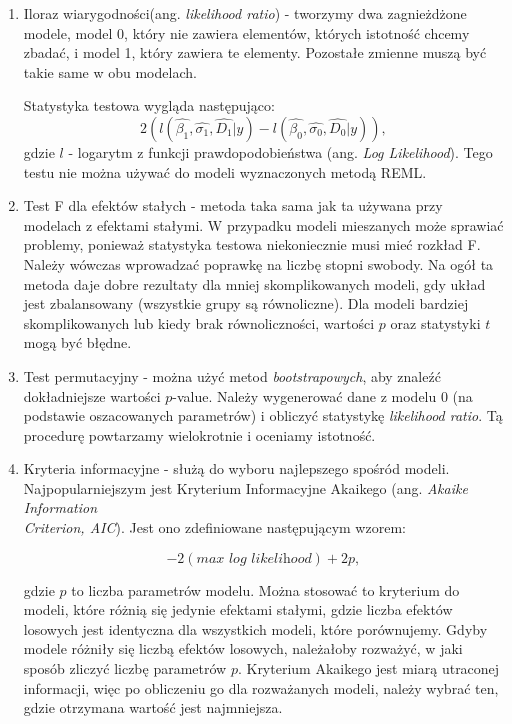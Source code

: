 \documentclass[12pt]{mwbk}
\theoremstyle{plain}
\theoremstyle{definition}
\theoremstyle{remark}
\begin{document}
\begin{enumerate}
	\item Iloraz wiarygodności(ang. \textit{likelihood ratio}) - tworzymy dwa zagnieżdżone modele, model 0, który nie zawiera elementów, których istotność chcemy zbadać, i model 1, który zawiera te elementy. Pozostałe zmienne muszą być takie same w obu modelach.
	
	Statystyka testowa wygląda następująco:
	$$2(l(\hat{\beta_1}, \hat{\sigma_1}, \hat{D_1}|y)-l(\hat{\beta_0}, \hat{\sigma_0}, \hat{D_0}|y)),$$
	gdzie $l$ - logarytm z funkcji prawdopodobieństwa (ang. \textit{Log Likelihood}). Tego testu nie można używać do modeli wyznaczonych metodą REML.
	
	\item Test F dla efektów stałych - metoda taka sama jak ta używana przy modelach z efektami stałymi. W przypadku modeli mieszanych może sprawiać problemy, ponieważ statystyka testowa niekoniecznie musi mieć rozkład F. Należy wówczas wprowadzać poprawkę na liczbę stopni swobody. Na ogół ta metoda daje dobre rezultaty dla mniej skomplikowanych modeli, gdy układ jest zbalansowany (wszystkie grupy są równoliczne). Dla modeli bardziej skomplikowanych lub kiedy brak równoliczności, wartości $p$ oraz statystyki $t$ mogą być błędne.
	
	\item Test permutacyjny - można użyć metod \textit{bootstrapowych}, aby znaleźć dokładniejsze wartości $p$-value. Należy wygenerować dane z modelu 0 (na podstawie oszacowanych parametrów) i obliczyć statystykę \textit{likelihood ratio}. Tą procedurę powtarzamy wielokrotnie i oceniamy istotność.
	

	\item Kryteria informacyjne - służą do wyboru najlepszego spośród modeli. Najpopularniejszym jest Kryterium Informacyjne Akaikego (ang. \textit{Akaike Information \\Criterion, AIC}). Jest ono zdefiniowane następującym wzorem:
	
	$$-2(\textit{max log likelihood})+ 2p,$$
	
	gdzie $p$ to liczba parametrów modelu. Można stosować to kryterium do modeli, które różnią się jedynie efektami stałymi, gdzie liczba efektów losowych jest identyczna dla wszystkich modeli, które porównujemy. Gdyby modele różniły się liczbą efektów losowych, należałoby rozważyć, w jaki sposób zliczyć liczbę parametrów $p$. Kryterium Akaikego jest miarą utraconej informacji, więc po obliczeniu go dla rozważanych modeli, należy wybrać ten, gdzie otrzymana wartość jest najmniejsza.

\end{enumerate}
\end{document}
